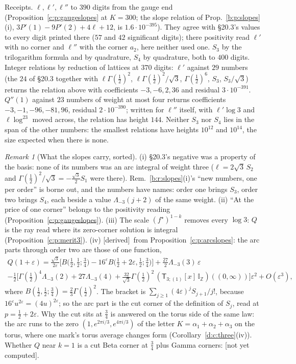 \documentclass[11pt]{article}
\newcommand{\sT}{\mathsf T}
\newcommand{\IZ}{\mathbb I_{\mathbb Z}}
\newcommand{\Tx}[3]{(\sT_{#1;(1)}[x]\,#2)((#3,\infty))}
\theoremstyle{plain}
\theoremstyle{definition}
\theoremstyle{remark}
\newtheorem{remark}[proposition]{Remark}
\newcommand{\derived}{\textup{[derived]}}
\newcommand{\notyet}{\textup{[not yet computed]}}
\begin{document}
\noindent Receipts. $\ell,\ell',\ell''$ to $390$ digits from the gauge end (Proposition~\ref{c:p:gaugeslopes} at $K=300$; the slope relation of Prop.~\ref{b:p:slopes}(i), $3P'(1)-9P'(2)+4\ell+12$, is $1.6\cdot10^{-395}$). They agree with \S20.3's values to every digit printed there ($57$ and $42$ significant digits); there positivity read $\ell'$ with no corner and $\ell''$ with the corner $a_2$, here neither used one. $S_3$ by the trilogarithm formula and by quadrature, $S_4$ by quadrature, both to $400$ digits. Integer relations by reduction of lattices at $370$ digits: $\ell'$ against $29$ numbers (the $24$ of \S20.3 together with $\ell\Gamma(\frac12)^2$, $\ell\Gamma(\frac12)^2/\sqrt3$, $\Gamma(\frac12)^6$, $S_3$, $S_3/\sqrt3$) returns the relation above with coefficients $-3,-6,2,36$ and residual $3\cdot10^{-391}$. $Q''(1)$ against $23$ numbers of weight at most four returns coefficients $-3,-1,-96,-81,96$, residual $2\cdot10^{-390}$; written for $\ell''$ itself, with $\ell'\log3$ and $\ell\log^23$ moved across, the relation has height $144$. Neither $S_3$ nor $S_4$ lies in the span of the other numbers: the smallest relations have heights $10^{12}$ and $10^{14}$, the size expected when there is none.

\begin{remark}[What the slopes carry, sorted]\label{c:r:slopes21}
(i) \S20.3's negative was a property of the basis: none of its numbers was an arc integral of weight three ($\ell=2\sqrt3\,S_2$ and $\Gamma(\frac12)^2/\sqrt3=-\frac{\sqrt3}2S_1$ were there). Rem.~\ref{b:r:slopes}(i)'s ``new numbers, one per order'' is borne out, and the numbers have names: order one brings $S_3$, order two brings $S_4$, each beside a value $\Lambda_{-3}(j+2)$ of the same weight. (ii) ``At the price of one corner'' belongs to the positivity reading (Proposition~\ref{c:p:gaugeslopes}). (iii) The scale $(f^\star)^{1-k}$ removes every $\log3$: $Q$ is the ray read where its zero-corner solution is integral (Proposition~\ref{c:p:merit3}). (iv) \derived\ from Proposition~\ref{c:p:arcslopes}: the arc parts through order two are those of one function,
\begin{multline*}
Q(1+\varepsilon)=\frac{\sqrt3}{2\varepsilon}\Big[B\big(\tfrac12,\tfrac12;\tfrac34\big)-16^\varepsilon B\big(\tfrac12+2\varepsilon,\tfrac12;\tfrac34\big)\Big]+\tfrac{27}2\Lambda_{-3}(3)\,\varepsilon\\
-\tfrac12\Big[\Gamma(\tfrac12)^4\Lambda_{-3}(2)+27\Lambda_{-3}(4)+\tfrac{32}{\sqrt3}\Gamma(\tfrac12)^2\,\Tx3{\IZ}0\Big]\varepsilon^2+O(\varepsilon^3),
\end{multline*}
where $B(\frac12,\frac12;\frac34)=\frac23\Gamma(\frac12)^2$. The bracket is $\sum_{j\ge1}(4\varepsilon)^jS_{j+1}/j!$, because $16^\varepsilon u^{2\varepsilon}=(4u)^{2\varepsilon}$; so the arc part is the cut corner of the definition of $S_j$, read at $p=\frac12+2\varepsilon$. Why the cut sits at $\frac34$ is answered on the torus side of the same law: the arc runs to the zero $(1,e^{2\pi i/3},e^{4\pi i/3})$ of the letter $K=\alpha_1+\alpha_2+\alpha_3$ on the torus, where one mark's torus average changes form (Corollary~\ref{d:c:three}(iv)). Whether $Q$ near $k=1$ is a cut Beta corner at $\frac34$ plus Gamma corners: \notyet.
\end{remark}
\end{document}
